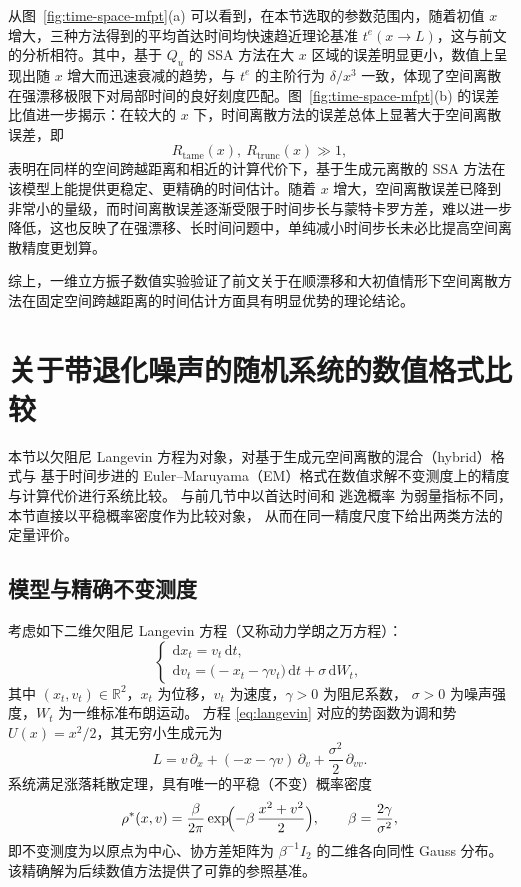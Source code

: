 从图~\ref{fig:time-space-mfpt}(a) 可以看到，在本节选取的参数范围内，随着初值 \(x\) 增大，三种方法得到的平均首达时间均快速趋近理论基准 \(t^e(x\to L)\)，这与前文的分析相符。其中，基于 \(Q_{u}\) 的 SSA 方法在大 \(x\) 区域的误差明显更小，数值上呈现出随 \(x\) 增大而迅速衰减的趋势，与 \(t^e\) 的主阶行为 \(\delta/x^3\) 一致，体现了空间离散在强漂移极限下对局部时间的良好刻度匹配。图~\ref{fig:time-space-mfpt}(b) 的误差比值进一步揭示：在较大的 \(x\) 下，时间离散方法的误差总体上显著大于空间离散误差，即
\[
R_{\mathrm{tame}}(x),\ R_{\mathrm{trunc}}(x) \gg 1,
\]
表明在同样的空间跨越距离和相近的计算代价下，基于生成元离散的 SSA 方法在该模型上能提供更稳定、更精确的时间估计。随着 \(x\) 增大，空间离散误差已降到非常小的量级，而时间离散误差逐渐受限于时间步长与蒙特卡罗方差，难以进一步降低，这也反映了在强漂移、长时间问题中，单纯减小时间步长未必比提高空间离散精度更划算。

综上，一维立方振子数值实验验证了前文关于在顺漂移和大初值情形下空间离散方法在固定空间跨越距离的时间估计方面具有明显优势的理论结论。

	\section{关于带退化噪声的随机系统的数值格式比较}
	\label{sec:langevin-invariant}
	
	本节以欠阻尼 Langevin 方程为对象，对基于生成元空间离散的混合（hybrid）格式与
	基于时间步进的 Euler--Maruyama（EM）格式在数值求解不变测度上的精度与计算代价进行系统比较。
	与前几节中以首达时间和 逃逸概率 为弱量指标不同，本节直接以平稳概率密度作为比较对象，
	从而在同一精度尺度下给出两类方法的定量评价。
	
	\subsection{模型与精确不变测度}
	
	考虑如下二维欠阻尼 Langevin 方程（又称动力学朗之万方程）：
	\begin{equation}\label{eq:langevin}
		\begin{cases}
			\mathrm{d}x_t = v_t\,\mathrm{d}t, \\
			\mathrm{d}v_t = \bigl(-x_t - \gamma v_t\bigr)\,\mathrm{d}t + \sigma\,\mathrm{d}W_t,
		\end{cases}
	\end{equation}
	其中 $(x_t, v_t)\in\mathbb{R}^2$，$x_t$ 为位移，$v_t$ 为速度，$\gamma>0$ 为阻尼系数，
	$\sigma>0$ 为噪声强度，$W_t$ 为一维标准布朗运动。
	方程 \eqref{eq:langevin} 对应的势函数为调和势 $U(x) = x^2/2$，其无穷小生成元为
	\begin{equation}\label{eq:langevin-gen}
		L = v\,\partial_x + (-x - \gamma v)\,\partial_v
		+ \frac{\sigma^2}{2}\,\partial_{vv}.
	\end{equation}
	系统满足涨落耗散定理，具有唯一的平稳（不变）概率密度
	\begin{equation}\label{eq:langevin-true}
		\rho^*(x, v)
		= \frac{\beta}{2\pi}\exp\!\Bigl(-\beta\,\frac{x^2 + v^2}{2}\Bigr),
		\qquad \beta = \frac{2\gamma}{\sigma^2},
	\end{equation}
	即不变测度为以原点为中心、协方差矩阵为 $\beta^{-1} I_2$ 的二维各向同性 Gauss 分布。
	该精确解为后续数值方法提供了可靠的参照基准。
	
